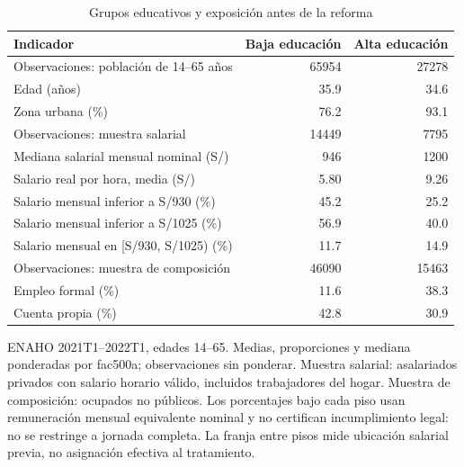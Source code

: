 \begin{table}[!htbp]\centering
\caption{Grupos educativos y exposición antes de la reforma}\label{tab:journal_desc}
\begin{threeparttable}\small
\setlength{\tabcolsep}{5pt}
\begin{tabular}{lrr}
\toprule
Indicador & Baja educación & Alta educación \\
\midrule
Observaciones: población de 14--65 años & 65954 & 27278 \\
Edad (años) & 35.9 & 34.6 \\
Zona urbana (\%) & 76.2 & 93.1 \\
Observaciones: muestra salarial & 14449 & 7795 \\
Mediana salarial mensual nominal (S/) & 946 & 1200 \\
Salario real por hora, media (S/) & 5.80 & 9.26 \\
Salario mensual inferior a S/930 (\%) & 45.2 & 25.2 \\
Salario mensual inferior a S/1025 (\%) & 56.9 & 40.0 \\
Salario mensual en [S/930, S/1025) (\%) & 11.7 & 14.9 \\
Observaciones: muestra de composición & 46090 & 15463 \\
Empleo formal (\%) & 11.6 & 38.3 \\
Cuenta propia (\%) & 42.8 & 30.9 \\
\bottomrule
\end{tabular}
\begin{tablenotes}\footnotesize
\item ENAHO 2021T1--2022T1, edades 14--65. Medias, proporciones y mediana ponderadas por fac500a; observaciones sin ponderar. Muestra salarial: asalariados privados con salario horario válido, incluidos trabajadores del hogar. Muestra de composición: ocupados no públicos. Los porcentajes bajo cada piso usan remuneración mensual equivalente nominal y no certifican incumplimiento legal: no se restringe a jornada completa. La franja entre pisos mide ubicación salarial previa, no asignación efectiva al tratamiento.
\end{tablenotes}\end{threeparttable}\end{table}
